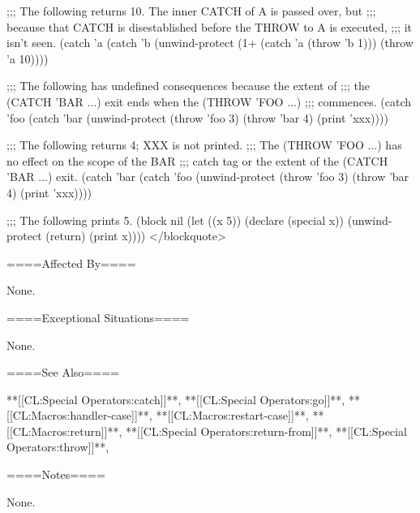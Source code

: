 ;;; The following returns 10. The inner CATCH of A is passed over, but ;;; because that CATCH is disestablished before the THROW to A is executed, ;;; it isn't seen. (catch 'a (catch 'b (unwind-protect (1+ (catch 'a (throw 'b 1))) (throw 'a 10))))


;;; The following has undefined consequences because the extent of ;;; the (CATCH 'BAR ...) exit ends when the (THROW 'FOO ...) ;;; commences. (catch 'foo (catch 'bar (unwind-protect (throw 'foo 3) (throw 'bar 4) (print 'xxx))))


;;; The following returns 4; XXX is not printed. ;;; The (THROW 'FOO ...) has no effect on the scope of the BAR ;;; catch tag or the extent of the (CATCH 'BAR ...) exit. (catch 'bar (catch 'foo (unwind-protect (throw 'foo 3) (throw 'bar 4) (print 'xxx))))


;;; The following prints 5. (block nil (let ((x 5)) (declare (special x)) (unwind-protect (return) (print x)))) </blockquote>


====Affected By====

None.

====Exceptional Situations====

None.

====See Also====

**[[CL:Special Operators:catch]]**, **[[CL:Special Operators:go]]**, **[[CL:Macros:handler-case]]**, **[[CL:Macros:restart-case]]**, **[[CL:Macros:return]]**, **[[CL:Special Operators:return-from]]**, **[[CL:Special Operators:throw]]**, {\secref\Evaluation}

====Notes====

None.

 
